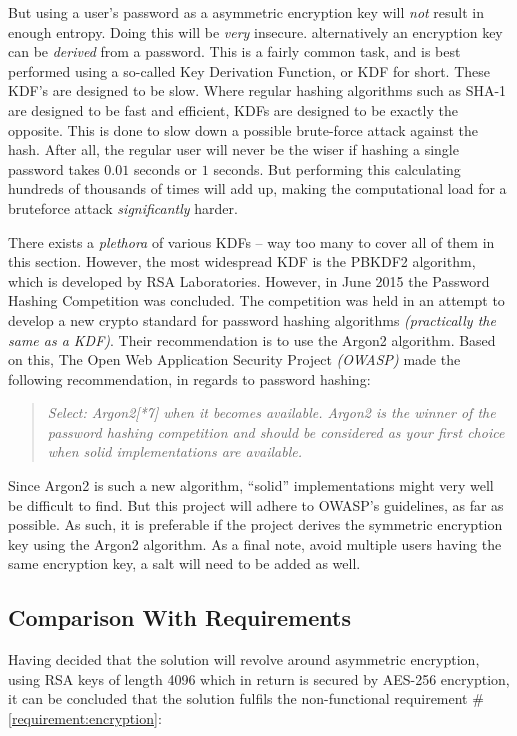 				But using a user's password as a asymmetric encryption key will \emph{not} result in enough entropy. Doing this will be \emph{very} insecure. alternatively an encryption key can be \emph{derived} from a password. This is a fairly common task, and is best performed using a so-called Key Derivation Function, or KDF for short. These KDF's are designed to be slow. Where regular hashing algorithms such as SHA-1 are designed to be fast and efficient, KDFs are designed to be exactly the opposite. This is done to slow down a possible brute-force attack against the hash. After all, the regular user will never be the wiser if hashing a single password takes $0.01$ seconds or $1$ seconds. But performing this calculating hundreds of thousands of times will add up, making the computational load for a bruteforce attack \emph{significantly} harder. 

				There exists a \emph{plethora} of various KDFs -- way too many to cover all of them in this section. However, the most widespread KDF is the PBKDF2 algorithm\cite{rfc2898}, which is developed by RSA Laboratories. However, in June 2015 the Password Hashing Competition was concluded\cite{phc}. The competition was held in an attempt to develop a new crypto standard for password hashing algorithms \emph{(practically the same as a KDF)}. Their recommendation is to use the Argon2 algorithm\cite{biryukov2015argon}. Based on this, The Open Web Application Security Project \emph{(OWASP)} made the following recommendation, in regards to password hashing:
				\begin{quote}
					\emph{Select:
						Argon2[*7] when it becomes available. Argon2 is the winner of the password hashing competition and should be considered as your first choice when solid implementations are available.
					}\\\cite{owasp_kdf}
				\end{quote}

				Since Argon2 is such a new algorithm, ``solid'' implementations might very well be difficult to find. But this project will adhere to OWASP's guidelines, as far as possible. As such, it is preferable if the project derives the symmetric encryption key using the Argon2 algorithm. As a final note, avoid multiple users having the same encryption key, a salt will need to be added as well. 

		\subsection{Comparison With Requirements}
			\label{requirement:fulfilled:sharing}
			\label{requirement:fulfilled:passwords_local}
			\label{requirement:fulfilled:encryption}
			Having decided that the solution will revolve around asymmetric encryption, using RSA keys of length 4096 which in return is secured by AES-256 encryption, it can be concluded that the solution fulfils the non-functional requirement \#\ref{requirement:encryption}:


